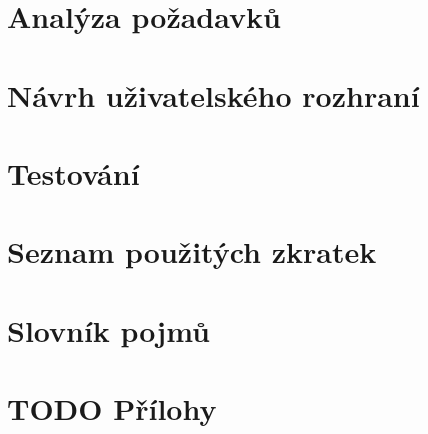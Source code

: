 \documentclass[thesis=M,czech,hidelinks]{../template/FITthesisXE}
\begin{document}


\begin{introduction} \label{introduction}

\end{introduction}

\chapter{Analýza požadavků}
\chapter{Návrh uživatelského rozhraní}


\chapter{Testování}



\nocite{*}
\printbibliography[title={Zdroje}]

\appendix

\chapter{Seznam použitých zkratek}
\printglossary[type=\acronymtype,style=acronyms]

\chapter{Slovník pojmů}
\printglossary[type=main]

\chapter{TODO Přílohy}
\end{document}
